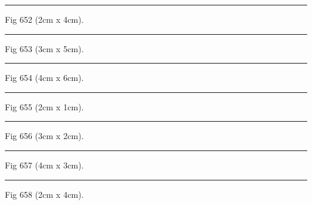 \documentclass[a4paper,11pt]{article}
\begin{document}
\begin{swarmwrap}%
  \begin{minipage}[t]{2cm}
    \centering
    \rule{\linewidth}{4cm}
    {\footnotesize Fig 652 (2cm x 4cm).}
  \end{minipage}%
\end{swarmwrap}%
\swarmwrapnext
\lipsum[52]%

\begin{swarmwrap}%
  \begin{minipage}[t]{3cm}
    \centering
    \rule{\linewidth}{5cm}
    {\footnotesize Fig 653 (3cm x 5cm).}
  \end{minipage}%
\end{swarmwrap}%
\swarmwrapnext
\lipsum[53]%

\begin{swarmwrap}%
  \begin{minipage}[t]{4cm}
    \centering
    \rule{\linewidth}{6cm}
    {\footnotesize Fig 654 (4cm x 6cm).}
  \end{minipage}%
\end{swarmwrap}%
\swarmwrapnext
\lipsum[54]%

\begin{swarmwrap}%
  \begin{minipage}[t]{2cm}
    \centering
    \rule{\linewidth}{1cm}
    {\footnotesize Fig 655 (2cm x 1cm).}
  \end{minipage}%
\end{swarmwrap}%
\swarmwrapnext
\lipsum[55]%

\begin{swarmwrap}%
  \begin{minipage}[t]{3cm}
    \centering
    \rule{\linewidth}{2cm}
    {\footnotesize Fig 656 (3cm x 2cm).}
  \end{minipage}%
\end{swarmwrap}%
\swarmwrapnext
\lipsum[56]%

\begin{swarmwrap}%
  \begin{minipage}[t]{4cm}
    \centering
    \rule{\linewidth}{3cm}
    {\footnotesize Fig 657 (4cm x 3cm).}
  \end{minipage}%
\end{swarmwrap}%
\swarmwrapnext
\lipsum[57]%

\begin{swarmwrap}%
  \begin{minipage}[t]{2cm}
    \centering
    \rule{\linewidth}{4cm}
    {\footnotesize Fig 658 (2cm x 4cm).}
  \end{minipage}%
\end{swarmwrap}%
\swarmwrapnext
\lipsum[58]%
\end{document}
